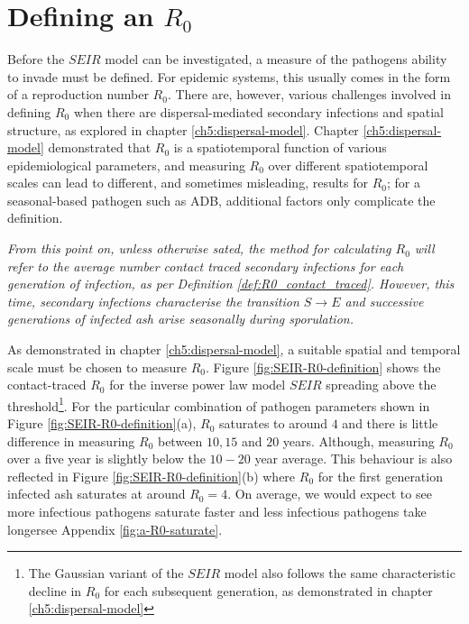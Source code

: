 \section{Defining an $R_0$}

Before the $SEIR$ model can be investigated, a measure of the pathogens ability to invade must be defined. For epidemic systems, this usually comes in the form of a reproduction number $R_0$. There are, however, various challenges involved in defining $R_0$ when there are dispersal-mediated secondary infections and spatial structure, as explored in chapter \ref{ch5:dispersal-model}. Chapter \ref{ch5:dispersal-model} demonstrated that $R_0$ is a spatiotemporal function of various epidemiological parameters, and measuring $R_0$ over different spatiotemporal scales can lead to different, and sometimes misleading, results for $R_0$; for a seasonal-based pathogen such as ADB, additional factors only complicate the definition. 

\textit{From this point on, unless otherwise sated, the method for calculating $R_0$ will refer to the average number contact traced secondary infections for each generation of infection, as per Definition \ref{def:R0_contact_traced}. However, this time, secondary infections characterise the transition $S\rightarrow E$ and successive generations of infected ash arise seasonally during sporulation.}

As demonstrated in chapter \ref{ch5:dispersal-model}, a suitable spatial and temporal scale must be chosen to measure $R_0$. Figure \ref{fig:SEIR-R0-definition} shows the contact-traced $R_0$ for the inverse power law model $SEIR$ spreading above the threshold\footnote{The Gaussian variant of the $SEIR$ model also follows the same characteristic decline in $R_0$ for each subsequent generation, as demonstrated in chapter \ref{ch5:dispersal-model}}. For the particular combination of pathogen parameters shown in Figure \ref{fig:SEIR-R0-definition}(a), $R_0$ saturates to around $4$ and there is little difference in measuring $R_0$ between $10, 15$ and $20$ years. Although, measuring $R_0$ over a five year is slightly below the $10-20$ year average. This behaviour is also reflected in Figure \ref{fig:SEIR-R0-definition}(b) where $R_0$ for the first generation infected ash saturates at around $R_0 = 4$. On average, we would expect to see more infectious pathogens saturate faster and less infectious pathogens take longer\textemdash see Appendix \ref{fig:a-R0-saturate}.


